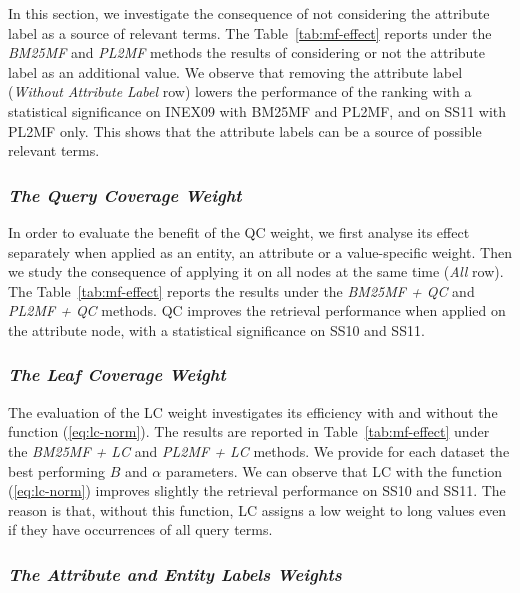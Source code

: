 In this section, we investigate the consequence of not considering the attribute label as a source of relevant terms.
The Table~\ref{tab:mf-effect} reports under the \emph{BM25MF} and \emph{PL2MF} methods the results of considering or not the attribute label as an additional value.
We observe that removing the attribute label (\emph{Without Attribute Label} row) lowers the performance of the ranking with a statistical significance on INEX09 with BM25MF and PL2MF, and on SS11 with PL2MF only. This shows that the attribute labels can be a source of possible relevant terms.

\subsubsection{\emph{The Query Coverage Weight}}
\label{sec:qc-weight-effect}

In order to evaluate the benefit of the QC weight, we first analyse its effect separately when applied as an entity, an attribute or a value-specific weight. Then we study the consequence of applying it on all nodes at the same time (\emph{All} row). The Table~\ref{tab:mf-effect} reports the results under the \emph{BM25MF + QC} and \emph{PL2MF + QC} methods. QC improves the retrieval performance when applied on the attribute node, with a statistical significance on SS10 and SS11.

\subsubsection{\emph{The Leaf Coverage Weight}}
\label{sec:lc-weight-effect}

The evaluation of the LC weight investigates its efficiency with and without the function (\ref{eq:lc-norm}). The results are reported in Table~\ref{tab:mf-effect} under the \emph{BM25MF + LC} and \emph{PL2MF + LC} methods. We provide for each dataset the best performing $B$ and $\alpha$ parameters. We can observe that LC with the function (\ref{eq:lc-norm}) improves slightly the retrieval performance on SS10 and SS11. The reason is that, without this function, LC assigns a low weight to long values even if they have occurrences of all query terms.

\subsubsection{\emph{The Attribute and Entity Labels Weights}}
\label{sec:ael-weight-effect}

